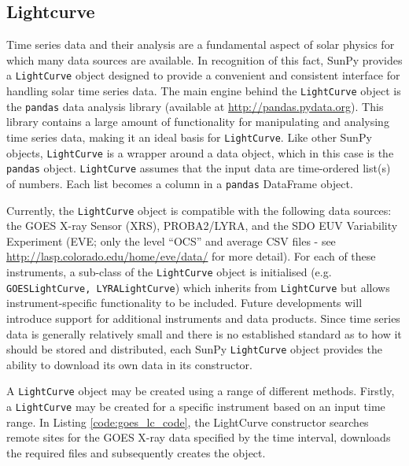 \subsection{Lightcurve}\label{sec:lightcurve}

Time series data and their analysis are a fundamental aspect of solar
physics for which many data sources are available.  In recognition of
this fact, SunPy provides a \texttt{LightCurve} object designed to
provide a convenient and consistent interface for handling solar time
series data.  The main engine behind the \texttt{LightCurve} object is
the \texttt{pandas} data analysis library (available at
\url{http://pandas.pydata.org}).  This library contains a large amount
of functionality for manipulating and analysing time series data,
making it an ideal basis for \texttt{LightCurve}.  Like other SunPy
objects, \texttt{LightCurve} is a wrapper around a data object, which
in this case is the \texttt{pandas} object.  \texttt{LightCurve}
assumes that the input data are time-ordered list(s) of numbers.  Each
list becomes a column in a \texttt{pandas} DataFrame object.

Currently, the \texttt{LightCurve} object is compatible with the
following data sources: the GOES X-ray Sensor (XRS), PROBA2/LYRA, and
the SDO EUV Variability Experiment (EVE; only the level ``OCS'' and
average CSV files - see \url{http://lasp.colorado.edu/home/eve/data/}
for more detail).  For each of these instruments, a sub-class of the
\texttt{LightCurve} object is initialised
(e.g. \texttt{GOESLightCurve, LYRALightCurve}) which inherits from
\texttt{LightCurve} but allows instrument-specific functionality to be
included.  Future developments will introduce support for additional
instruments and data products.  Since time series data is generally
relatively small and there is no established standard as to how it
should be stored and distributed, each SunPy \texttt{LightCurve}
object provides the ability to download its own data in its
constructor.


A \texttt{LightCurve} object may be created using a range of different
methods.  Firstly, a \texttt{LightCurve} may be created for a specific
instrument based on an input time range. In Listing
\ref{code:goes_lc_code}, the LightCurve constructor searches remote
sites for the GOES X-ray data specified by the time interval,
downloads the required files and subsequently creates the object.

